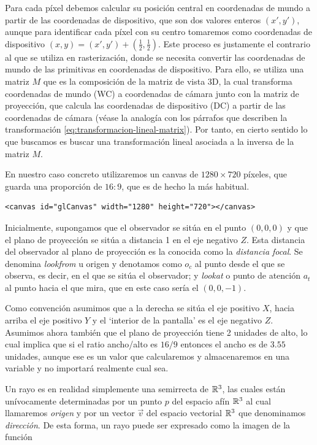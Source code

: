 Para cada píxel debemos calcular su posición central en coordenadas de mundo a partir de las coordenadas de dispositivo, que son dos valores enteros $(x',y')$, aunque para identificar cada píxel con su centro tomaremos como coordenadas de dispositivo $(x,y)=(x',y')+\left(\frac 1 2, \frac 1 2\right)$. Este proceso es justamente el contrario al que se utiliza en rasterización, donde se necesita convertir las coordenadas de mundo de las primitivas en coordenadas de dispositivo. Para ello, se utiliza una matriz $M$ que es la composición de la matriz de vista 3D, la cual transforma coordenadas de mundo (WC) a coordenadas de cámara junto con la matriz de proyección, que calcula las coordenadas de dispositivo (DC) a partir de las coordenadas de cámara (véase la analogía con los párrafos que describen la transformación \ref{eq:transformacion-lineal-matrix}). Por tanto, en cierto sentido lo que buscamos es buscar una transformación lineal asociada a la inversa de la matriz $M$.

En nuestro caso concreto utilizaremos un canvas de $1280\times 720$ píxeles, que guarda una proporción de $16:9$, que es de hecho la más habitual.

\begin{lstlisting}
<canvas id="glCanvas" width="1280" height="720"></canvas>
\end{lstlisting}

Inicialmente, supongamos que el observador se sitúa en el punto $(0,0,0)$ y que el plano de proyección se sitúa a distancia 1 en el eje negativo $Z$. Esta distancia del observador al plano de proyección es la conocida como la \textit{distancia focal}. Se denomina \textit{lookfrom} u origen y denotamos como $o_c$ al punto desde el que se observa, es decir, en el que se sitúa el observador; y \textit{lookat} o punto de atención $a_t$ al punto hacia el que mira, que en este caso sería el $(0,0,-1)$. 

Como convención asumimos que a la derecha se sitúa el eje positivo $X$, hacia arriba el eje positivo $Y$ y el `interior de la pantalla' es el eje negativo $Z$. Asumimos ahora también que el plano de proyección tiene 2 unidades de alto, lo cual implica que si el ratio ancho/alto es $16/9$ entonces el ancho es de $3.55$ unidades, aunque ese es un valor que calcularemos y almacenaremos en una variable y no importará realmente cual sea.

Un rayo es en realidad simplemente una semirrecta de $\mathbb{R}^3$, las cuales están unívocamente determinadas por un punto $p$ del espacio afín $\mathbb{R}^3$ al cual llamaremos \textit{origen} y por un vector $\vec v$ del espacio vectorial $\mathbb{R}^3$ que denominamos \textit{dirección}. De esta forma, un rayo puede ser expresado como la imagen de la función


